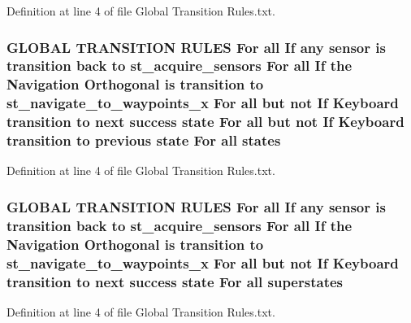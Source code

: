 Definition at line 4 of file Global Transition Rules.\+txt.

\subsubsection[{\texorpdfstring{states}{states}}]{\setlength{\rightskip}{0pt plus 5cm}G\+L\+O\+B\+AL T\+R\+A\+N\+S\+I\+T\+I\+ON R\+U\+L\+ES For all If any sensor is transition back to st\+\_\+acquire\+\_\+sensors For all If the Navigation {\bf Orthogonal} is transition to st\+\_\+navigate\+\_\+to\+\_\+waypoints\+\_\+x For all but not If Keyboard transition to next success state For all but not If Keyboard transition to previous state For all states}\hypertarget{docs_2Global_01Transition_01Rules_8txt_a54d1602740c77675ed14ebfe688f4374}{}\label{docs_2Global_01Transition_01Rules_8txt_a54d1602740c77675ed14ebfe688f4374}


Definition at line 4 of file Global Transition Rules.\+txt.

\subsubsection[{\texorpdfstring{superstates}{superstates}}]{\setlength{\rightskip}{0pt plus 5cm}G\+L\+O\+B\+AL T\+R\+A\+N\+S\+I\+T\+I\+ON R\+U\+L\+ES For all If any sensor is transition back to st\+\_\+acquire\+\_\+sensors For all If the Navigation {\bf Orthogonal} is transition to st\+\_\+navigate\+\_\+to\+\_\+waypoints\+\_\+x For all but not If Keyboard transition to next success state For all superstates}\hypertarget{docs_2Global_01Transition_01Rules_8txt_af31ae27f561335eed0d5161d8ee256f8}{}\label{docs_2Global_01Transition_01Rules_8txt_af31ae27f561335eed0d5161d8ee256f8}


Definition at line 4 of file Global Transition Rules.\+txt.

